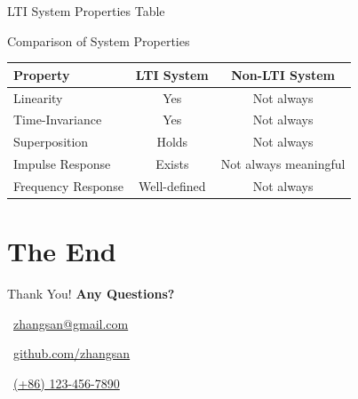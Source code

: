 \documentclass[10pt]{beamer}
\begin{document}
\begin{frame}{LTI System Properties Table}
  \begin{block}{Comparison of System Properties}
    \begin{tabularx}{\textwidth}{lcc}
      \toprule
      \textbf{Property} & \textbf{LTI System} & \textbf{Non-LTI System} \\
      \midrule
      Linearity & Yes & Not always \\
      Time-Invariance & Yes & Not always \\
      Superposition & Holds & Not always \\
      Impulse Response & Exists & Not always meaningful \\
      Frequency Response & Well-defined & Not always \\
      \bottomrule
    \end{tabularx}
  \end{block}
\end{frame}


\section{The End}
\begin{frame}{Thank You!}
  \centering
  \Huge{\bfseries Any Questions?} 
  \vskip0.3cm
    \vskip0.3cm
    \small
  \faEnvelope\ \url{zhangsan@gmail.com} \quad

  \faGithub\ \url{github.com/zhangsan} \quad

  \faPhone\ \url{(+86) 123-456-7890} \\[1cm]
  \vfill
\end{frame}
\end{document}
